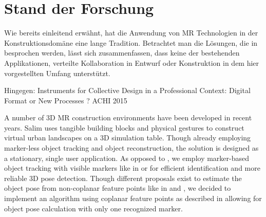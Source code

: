 \section{Stand der Forschung}
\label{sec:forschung}

Wie bereits einleitend erwähnt, hat die Anwendung von MR Technologien in der Konstruktionsdomäne eine lange Tradition. Betrachtet man die Lösungen, die in \cite{Rankohi:2013} besprochen werden, lässt sich zusammenfassen, dass keine der bestehenden Applikationen, verteilte Kollaboration in Entwurf oder Konstruktion in dem hier vorgestellten Umfang unterstützt. 

Hingegen: Instruments for Collective Design in a Professional Context: Digital Format or New Processes ? ACHI 2015

A number of 3D MR construction environments have been developed in recent years. Salim \cite{Salim:2014:TUS:2664323.2664346} uses tangible building blocks and physical gestures to construct virtual urban landscapes on a 3D simulation table. Though  already employing marker-less object tracking and object reconstruction, the solution is designed as a stationary, single user application. As opposed to \cite{Salim:2014:TUS:2664323.2664346}, we employ marker-based object tracking with visible markers like in \cite{garrido2014automatic} or \cite{fiala2010designing} for efficient identification and more reliable 3D pose detection. Though different proposals exist to estimate the object pose from non-coplanar feature points like in \cite{qin2008new} and \cite{DeMenthon95model-basedobject}, we decided to implement an algorithm using coplanar feature points as described in \cite{oberkampf1996iterative} allowing for object pose calculation with only one recognized marker. 

